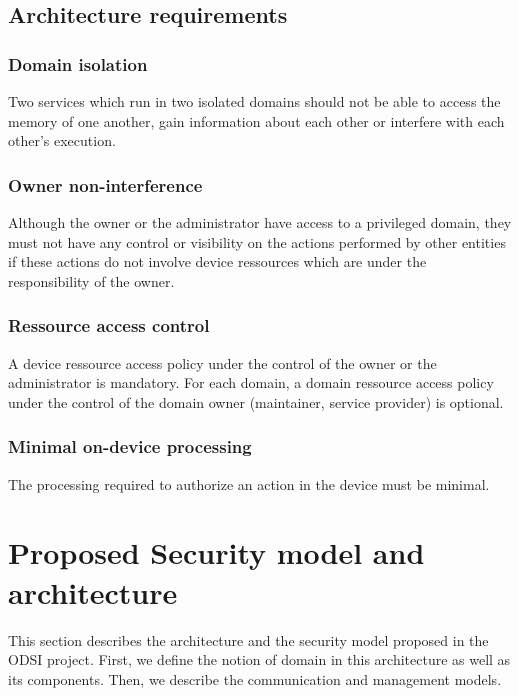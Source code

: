 \documentclass[conference]{IEEEtran}
\begin{document}
\subsection{Architecture requirements}
\label{sec:Arch_req}

\subsubsection{Domain isolation}
Two services which run in two isolated domains should not be able to access the memory of one another, gain information about each other or interfere with each other's execution. 

\subsubsection{Owner non-interference}
Although the owner or the administrator have access to a privileged domain, they must not have any control or visibility on the actions performed by other entities if these actions do not involve device ressources which are under the responsibility of the owner.

\subsubsection{Ressource access control}
A device ressource access policy under the control of the owner or the administrator is mandatory. For each domain, a domain ressource access policy under the control of the domain owner (maintainer, service provider) is optional. 

\subsubsection{Minimal on-device processing}
The processing required to authorize an action in the device must be minimal. 

\section{Proposed Security model and architecture}
\label{sec:Architecture}
This section describes the architecture and the security model proposed in the ODSI project. First, we define the notion of domain in this architecture as well as its components. Then, we describe the communication and management models.
\end{document}
